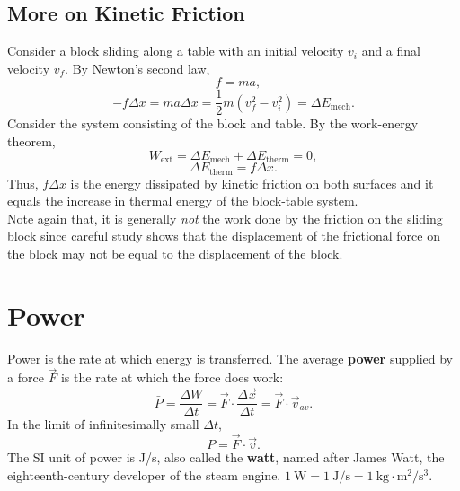 \documentclass[11pt,a4paper]{report}
\begin{document}
\subsection{More on Kinetic Friction}
Consider a block sliding along a table with an initial velocity $v_i$ and a final velocity $v_f$. By Newton's second law, $$-f = ma,$$ $$-f \Delta{x} = ma \Delta{x} = \frac{1}{2} m\left(v_f^2 - v_i^2\right) = \Delta{E_\mathrm{mech}}.$$
Consider the system consisting of the block and table. By the work-energy theorem, $$W_\mathrm{ext} = \Delta{E_\mathrm{mech}} + \Delta{E_\mathrm{therm}} = 0,$$ $$\Delta{E_\mathrm{therm}} = f \Delta{x}.$$
Thus, $f \Delta{x}$ is the energy dissipated by kinetic friction on both surfaces and it equals the increase in thermal energy of the block-table system.
\\Note again that, it is generally \textit{not} the work done by the friction on the sliding block since careful study shows that the displacement of the frictional force on the block may not be equal to the displacement of the block.

\section{Power}
Power is the rate at which energy is transferred. The average \textbf{power} supplied by a force $\vec{F}$ is the rate at which the force does work: $$\bar{P} = \frac{\Delta{W}}{\Delta{t}} = \vec{F} \cdot \frac{\Delta{\vec{x}}}{\Delta{t}} = \vec{F} \cdot \vec{v}_{av}.$$
In the limit of infinitesimally small $\Delta{t}$, $$P = \vec{F} \cdot \vec{v}.$$
The SI unit of power is J/s, also called the \textbf{watt}, named after James Watt, the eighteenth-century developer of the steam engine. $1 \mathrm{\ W} = 1 \mathrm{\ J} / \mathrm{s} = 1 \mathrm{\ kg} \cdot \mathrm{m}^2 / \mathrm{s}^3$.
\end{document}
